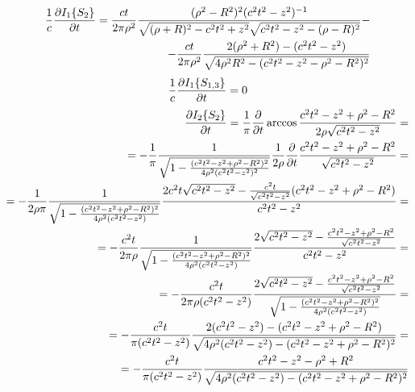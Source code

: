 %
\begin{equation*} \begin{aligned}
\frac{1}{c} \frac{\partial  I_1 \{ S_2 \} }{\partial t} = \frac{ ct }{2 \pi \rho^2} 
\frac{ (\rho^2 - R^2)^2  (c^2 t^2 - z^2)^{-1} } 
{ \sqrt{ (\rho + R)^2 - c^2t^2 + z^2 } 
\sqrt{ c^2t^2 - z^2 - (\rho - R)^2 } } - \\
- \frac{ct}{2 \pi \rho^2} \frac{2 (\rho^2 + R^2) - (c^2 t^2 - z^2)}
{ \sqrt{4 \rho^2 R^2 - (c^2t^2 - z^2 - \rho^2 - R^2)^2} }
\end{aligned} \end{equation*}
%
\begin{equation*} \begin{aligned}
\frac{1}{c} \frac{\partial  I_1 \{ S_{1,3} \} }{\partial t} = 0
\end{aligned} \end{equation*}
%
\textcolor{lightgray}{ \begin{equation*} \begin{aligned}
\frac{\partial  I_2 \{ S_2 \} }{\partial t} = \frac{1}{\pi} \frac{\partial }{\partial t} \arccos 
\frac{c^2t^2 - z^2 + \rho^2 - R^2}{2 \rho \sqrt{c^2t^2 - z^2}} = \\
= - \frac{1}{\pi} \frac{1} { \sqrt{ 1 - \frac{ (c^2t^2 - z^2 + \rho^2 - R^2)^2 }
{4 \rho^2 (c^2t^2 - z^2)^2} } } \frac{1}{2 \rho} \frac{\partial }{\partial t} 
\frac{c^2t^2 - z^2 + \rho^2 - R^2} {\sqrt{c^2t^2 - z^2}} = \\
= - \frac{1}{2 \rho \pi} \frac{1} 
{ \sqrt{ 1 - \frac{ (c^2t^2 - z^2 + \rho^2 - R^2)^2 }
{4 \rho^2 (c^2t^2 - z^2)} } } \frac{2c^2t \sqrt{c^2t^2 - z^2} - 
\frac{c^2t}{\sqrt{c^2t^2 - z^2}} (c^2t^2 - z^2 + \rho^2 - R^2)
}{c^2t^2 - z^2} = \\ = - \frac{c^2 t}{2 \pi \rho} \frac{1} 
{ \sqrt{ 1 - \frac{ (c^2t^2 - z^2 + \rho^2 - R^2)^2 }
{4 \rho^2 (c^2t^2 - z^2)} } } \frac{2 \sqrt{c^2t^2 - z^2} - 
\frac{c^2t^2 - z^2 + \rho^2 - R^2}{\sqrt{c^2t^2 - z^2}}}{c^2t^2 - z^2} = \\
= - \frac{c^2 t}{2 \pi \rho (c^2t^2 - z^2)} \frac{ 2 \sqrt{c^2t^2 - z^2} - 
\frac{c^2t^2 - z^2 + \rho^2 - R^2}{\sqrt{c^2t^2 - z^2}} } 
{ \sqrt{ 1 - \frac{ (c^2t^2 - z^2 + \rho^2 - R^2)^2 }
{4 \rho^2 (c^2t^2 - z^2)} } } = \\
= - \frac{c^2 t}{\pi (c^2t^2 - z^2) } 
\frac{ 2 (c^2t^2 - z^2) - (c^2t^2 - z^2 + \rho^2 - R^2) } 
{ \sqrt{ 4 \rho^2 (c^2t^2 - z^2) - (c^2t^2 - z^2 + \rho^2 - R^2)^2 } } = \\
= - \frac{c^2 t}{\pi (c^2t^2 - z^2) } \frac{ c^2t^2 - z^2 -  \rho^2 + R^2 } 
{ \sqrt{ 4 \rho^2 (c^2t^2 - z^2) - (c^2t^2 - z^2 + \rho^2 - R^2)^2 } }
\end{aligned} \end{equation*} }

